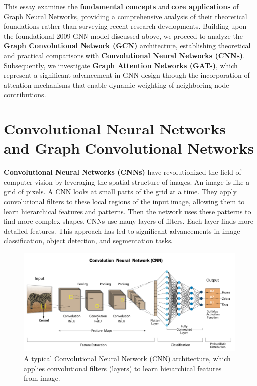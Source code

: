 \documentclass{article}
\begin{document}
This essay examines the \textbf{fundamental concepts} and \textbf{core applications} of Graph Neural Networks, providing a comprehensive analysis of their theoretical foundations rather than surveying recent research developments.
Building upon the foundational 2009 GNN model discussed above, we proceed to analyze the \textbf{Graph Convolutional Network (GCN)} architecture, establishing theoretical and practical comparisons with \textbf{Convolutional Neural Networks (CNNs)}. Subsequently, we investigate \textbf{Graph Attention Networks (GATs)}, which represent a significant advancement in GNN design through the incorporation of attention mechanisms that enable dynamic weighting of neighboring node contributions.

\section{Convolutional Neural Networks and Graph Convolutional Networks}

\textbf{Convolutional Neural Networks (CNNs)} \cite{krizhevsky2012imagenet} have revolutionized the field of computer vision by leveraging the spatial structure of images.
An image is like a grid of pixels. A CNN looks at small parts of the grid at a time.
They apply convolutional filters to these local regions of the input image, allowing them to learn hierarchical features and patterns.
Then the network uses these patterns to find more complex shapes. CNNs use many layers of filters. Each layer finds more detailed features.
This approach has led to significant advancements in image classification, object detection, and segmentation tasks.

\newpage

\begin{figure}[h]
      \centering
      \includegraphics[width=1.0\textwidth]{../assets/cnn_architecture.png}
      \caption{A typical Convolutional Neural Network (CNN) architecture, which applies convolutional filters (layers) to learn hierarchical features from image.}
      \label{fig:cnn-architecture}
\end{figure}
\end{document}
